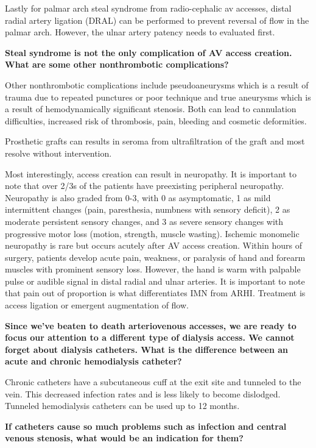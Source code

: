\documentclass[
]{book}
\begin{document}
Lastly for palmar arch steal syndrome from radio-cephalic av accesses,
distal radial artery ligation (DRAL) can be performed to prevent
reversal of flow in the palmar arch. However, the ulnar artery patency
needs to evaluated first.

\textbf{Steal syndrome is not the only complication of AV access creation.
What are some other nonthrombotic complications?}

Other nonthrombotic complications include pseudoaneurysms which is a
result of trauma due to repeated punctures or poor technique and true
aneurysms which is a result of hemodynamically significant stenosis.
Both can lead to cannulation difficulties, increased risk of thrombosis,
pain, bleeding and cosmetic deformities.

Prosthetic grafts can results in seroma from ultrafiltration of the
graft and most resolve without intervention.

Most interestingly, access creation can result in neuropathy. It is
important to note that over 2/3s of the patients have preexisting
peripheral neuropathy. Neuropathy is also graded from 0-3, with 0 as
asymptomatic, 1 as mild intermittent changes (pain, paresthesia,
numbness with sensory deficit), 2 as moderate persistent sensory
changes, and 3 as severe sensory changes with progressive motor loss
(motion, strength, muscle wasting). Ischemic monomelic neuropathy is
rare but occurs acutely after AV access creation. Within hours of
surgery, patients develop acute pain, weakness, or paralysis of hand and
forearm muscles with prominent sensory loss. However, the hand is warm
with palpable pulse or audible signal in distal radial and ulnar
arteries. It is important to note that pain out of proportion is what
differentiates IMN from ARHI. Treatment is access ligation or emergent
augmentation of flow.

\textbf{Since we've beaten to death arteriovenous accesses, we are ready to
focus our attention to a different type of dialysis access. We cannot
forget about dialysis catheters. What is the difference between an acute
and chronic hemodialysis catheter?}

Chronic catheters have a subcutaneous cuff at the exit site and tunneled
to the vein. This decreased infection rates and is less likely to become
dislodged. Tunneled hemodialysis catheters can be used up to 12 months.

\textbf{If catheters cause so much problems such as infection and central
venous stenosis, what would be an indication for them?}
\end{document}
